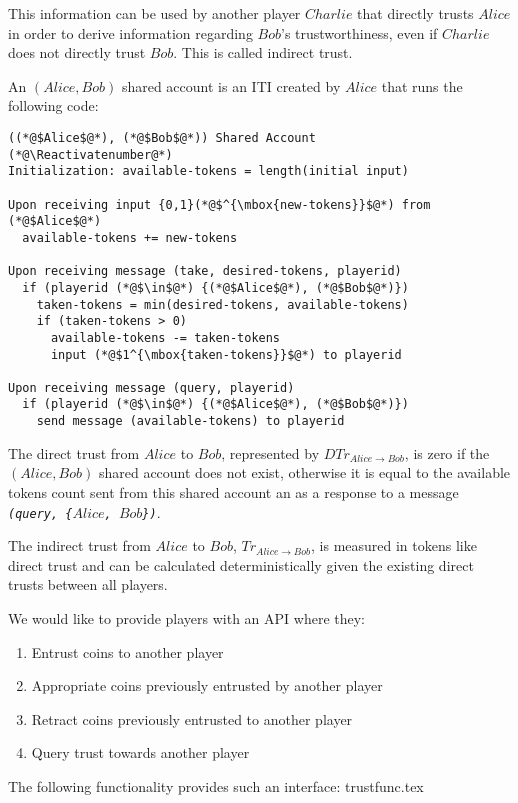   This information can be used by another player $Charlie$ that directly trusts $Alice$ in order to derive information
  regarding $Bob$'s trustworthiness, even if $Charlie$ does not directly trust $Bob$. This is called indirect trust.

  \begin{definition}
    An $\left(Alice, Bob\right)$ shared account is an ITI created by $Alice$ that runs the following code:
  \end{definition}
  \Suppressnumber
  \begin{lstlisting}[label=sharedaccount, style=numbers]
((*@$Alice$@*), (*@$Bob$@*)) Shared Account
(*@\Reactivatenumber@*)
Initialization: available-tokens = length(initial input)

Upon receiving input {0,1}(*@$^{\mbox{new-tokens}}$@*) from (*@$Alice$@*)
  available-tokens += new-tokens

Upon receiving message (take, desired-tokens, playerid)
  if (playerid (*@$\in$@*) {(*@$Alice$@*), (*@$Bob$@*)})
    taken-tokens = min(desired-tokens, available-tokens)
    if (taken-tokens > 0)
      available-tokens -= taken-tokens
      input (*@$1^{\mbox{taken-tokens}}$@*) to playerid

Upon receiving message (query, playerid)
  if (playerid (*@$\in$@*) {(*@$Alice$@*), (*@$Bob$@*)})
    send message (available-tokens) to playerid
  \end{lstlisting}
  \begin{definition}
    The direct trust from $Alice$ to $Bob$, represented by $DTr_{Alice \rightarrow Bob}$, is zero if the $\left(Alice,
    Bob\right)$ shared account does not exist, otherwise it is equal to the available tokens count sent from this shared
    account an as a response to a message \emph{\texttt{(query, \{}$Alice$\texttt{, }$Bob$\texttt{\})}}.
  \end{definition}

  \begin{definition}
    The indirect trust from $Alice$ to $Bob$, $Tr_{Alice \rightarrow Bob}$, is measured in tokens like direct trust and can be
    calculated deterministically given the existing direct trusts between all players.
  \end{definition}

  We would like to provide players with an API where they:
  \begin{enumerate}
    \item Entrust coins to another player
    \item Appropriate coins previously entrusted by another player
    \item Retract coins previously entrusted to another player
    \item Query trust towards another player
  \end{enumerate}
  The following functionality provides such an interface:
  {trustfunc.tex}

